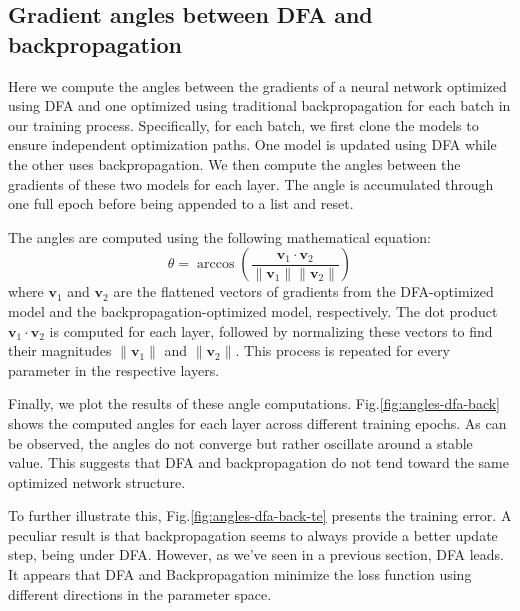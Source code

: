 \documentclass[english]{article}
\begin{document}
\subsection{Gradient angles between DFA and backpropagation}


Here we compute the angles between the gradients of a neural network optimized using DFA and one optimized using traditional backpropagation for each batch in our training process. Specifically, for each batch, we first clone the models to ensure independent optimization paths. One model is updated using DFA while the other uses backpropagation. We then compute the angles between the gradients of these two models for each layer. The angle is accumulated through one full epoch before being appended to a list and reset. 

The angles are computed using the following mathematical equation:
\[
\theta = \arccos\left(\frac{\mathbf{v}_1 \cdot \mathbf{v}_2}{\|\mathbf{v}_1\| \|\mathbf{v}_2\|}\right)
\]
where \(\mathbf{v}_1\) and \(\mathbf{v}_2\) are the flattened vectors of gradients from the DFA-optimized model and the backpropagation-optimized model, respectively. The dot product \(\mathbf{v}_1 \cdot \mathbf{v}_2\) is computed for each layer, followed by normalizing these vectors to find their magnitudes \(\|\mathbf{v}_1\|\) and \(\|\mathbf{v}_2\|\). This process is repeated for every parameter in the respective layers.

Finally, we plot the results of these angle computations. Fig.\ref{fig:angles-dfa-back} shows the computed angles for each layer across different training epochs. As can be observed, the angles do not converge but rather oscillate around a stable value. This suggests that DFA and backpropagation do not tend toward the same optimized network structure.

To further illustrate this, Fig.\ref{fig:angles-dfa-back-te} presents the training error. A peculiar result is that backpropagation seems to always provide a better update step, being under DFA. However, as we've seen in a previous section, DFA leads. It appears that DFA and Backpropagation minimize the loss function using different directions in the parameter space.
\end{document}

